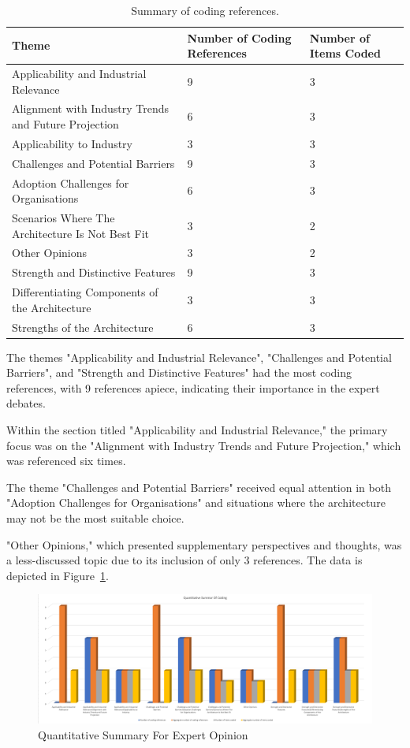 \documentclass[journal]{IEEEtran}
\begin{document}
\begin{table}
  \centering
  \caption{Summary of coding references.}
  \begin{tabular}{p{}p{}p{}}
  \hline
  Theme & Number of Coding References & Number of Items Coded \\
  \hline
  Applicability and Industrial Relevance & 9 & 3 \\
  Alignment with Industry Trends and Future Projection & 6 & 3 \\
  Applicability to Industry & 3 & 3 \\
  Challenges and Potential Barriers & 9 & 3 \\
  Adoption Challenges for Organisations & 6 & 3 \\
  Scenarios Where The Architecture Is Not Best Fit & 3 & 2 \\
  Other Opinions & 3 & 2 \\
  Strength and Distinctive Features & 9 & 3 \\
  Differentiating Components of the Architecture & 3 & 3 \\
  Strengths of the Architecture & 6 & 3 \\
  \hline
  \end{tabular}
  \label{tab:coding_summary}
  \end{table}


The themes "Applicability and Industrial Relevance", "Challenges and Potential Barriers", and "Strength and Distinctive Features" had the most coding references, with 9 references apiece, indicating their importance in the expert debates.

Within the section titled "Applicability and Industrial Relevance," the primary focus was on the "Alignment with Industry Trends and Future Projection," which was referenced six times.

The theme "Challenges and Potential Barriers" received equal attention in both "Adoption Challenges for Organisations" and situations where the architecture may not be the most suitable choice.

"Other Opinions," which presented supplementary perspectives and thoughts, was a less-discussed topic due to its inclusion of only 3 references. The data is depicted in Figure~\ref{fig:quantitativeSummaryForExpertOpinion}.



\begin{figure}[h]
  \centering
  \includegraphics[width=\textwidth]{images/Quantitative-Summary-For-Codes.png}
  \caption{Quantitative Summary For Expert Opinion}
  \label{fig:quantitativeSummaryForExpertOpinion}
\end{figure}
\end{document}
